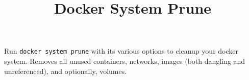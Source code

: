 \documentclass{article}
\title{Docker System Prune}
\author{}
\date{}
\begin{document}
\maketitle

Run \texttt{docker system prune} with its various options to cleanup your docker system. Removes all unused containers, networks, images (both dangling and unreferenced), and optionally, volumes.
\end{document}
